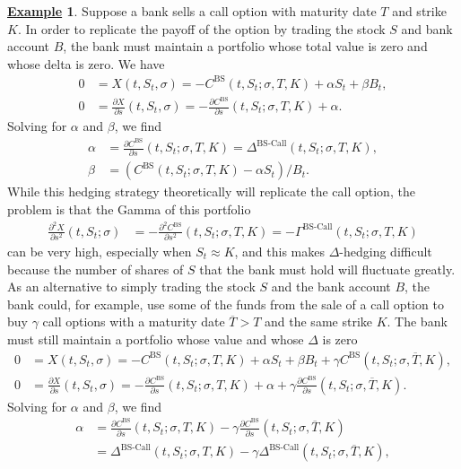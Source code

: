 \documentclass[12pt]{book}
\numberwithin{equation}{chapter}
\theoremstyle{plain}
\numberwithin{theorem}{section}
\theoremstyle{definition}
\newtheorem{example}[theorem]{\underline{Example}}
\numberwithin{exercise}{chapter}
\newcommand{\<}{\langle}
\renewcommand{\>}{\rangle}
\renewcommand{\(}{\left(}
\renewcommand{\)}{\right)}
\renewcommand{\[}{\left[}
\renewcommand{\]}{\right]}
\newcommand\sig{\sigma}
\newcommand\gam{\gamma}
\newcommand\Gam{\Gamma}
\newcommand\Del{\Delta}
\newcommand\Tb{\overline{T}}
\renewcommand\d{\partial}
\newcommand\BS{\textrm{BS}}
\theoremstyle{definition}
\numberwithin{question}{section}
\begin{document}
\begin{example}
Suppose a bank sells a call option with maturity date $T$ and strike $K$.  In order to replicate the payoff of the option by trading the stock $S$ and bank account $B$, the bank must maintain a portfolio whose total value is zero and whose delta is zero.  We have
\begin{align}
0
	&=	X(t,S_t,\sig) 
	=	- C^\text{BS}(t,S_t;\sig,T,K) + \alpha S_t + \beta B_t , \\
0
	&=	\frac{\d X}{\d s}(t,S_t,\sig) 
	=	- \frac{\d C^\text{BS}}{\d s}(t,S_t;\sig,T,K) + \alpha . 
\end{align}
Solving for $\alpha$ and $\beta$, we find
\begin{align}
\alpha
	&=	\frac{\d C^\BS}{\d s}(t,S_t;\sig,T,K) = \Del^\text{BS-Call}(t,S_t;\sig,T,K) , \\
\beta
	&=	( C^\text{BS}(t,S_t;\sig,T,K) - \alpha S_t ) / B_t .
\end{align}
While this hedging strategy theoretically will replicate the call option, the problem is that the Gamma of this portfolio
\begin{align}
\frac{\d^2 X}{\d s^2}(t,S_t;\sig)
	&=	- \frac{\d^2 C^\BS}{\d s^2}(t,S_t;\sig,T,K) = - \Gam^\text{BS-Call}(t,S_t;\sig,T,K)
\end{align}
 can be very high, especially when $S_t \approx K$, and this makes $\Delta$-hedging difficult because the number of shares of $S$ that the bank must hold will fluctuate greatly.  As an alternative to simply trading the stock $S$ and the bank account $B$, the bank could, for example, use some of the funds from the sale of a call option to buy $\gam$ call options with a maturity date $\Tb > T$ and the same strike $K$.  The bank must still maintain a portfolio whose value and whose $\Delta$ is zero
\begin{align}
0
	&=	X(t,S_t,\sig) 
	=	- C^\text{BS}(t,S_t;\sig,T,K) + \alpha S_t + \beta B_t + \gam C^\text{BS}(t,S_t;\sig,\Tb,K), \\
0
	&=	\frac{\d X}{\d s}(t,S_t,\sig) 
	=	- \frac{\d C^\text{BS}}{\d s}(t,S_t;\sig,T,K) + \alpha + \gam \frac{\d C^\text{BS}}{\d s}(t,S_t;\sig,\Tb,K). 
\end{align}
Solving for $\alpha$ and $\beta$, we find
\begin{align}
\alpha
	&=	\frac{\d C^\BS}{\d s}(t,S_t;\sig,T,K) - \gam \frac{\d C^\BS}{\d s}(t,S_t;\sig,\Tb,K) \\
	&= 	\Del^\text{BS-Call}(t,S_t;\sig,T,K) - \gam \Del^\text{BS-Call}(t,S_t;\sig,\Tb,K) , \\

\end{align}
\end{example}
\end{document}
